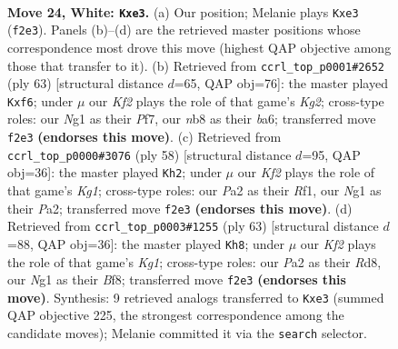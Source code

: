 \documentclass[11pt]{article}
\begin{document}
\clearpage

\begin{figure}[p]\centering
\begin{subfigure}{0.46\textwidth}\centering
\resizebox{\linewidth}{!}{%
\newchessgame
\chessboard[
  setfen={rn5r/8/5p1k/pB1p3p/8/4q3/PP3KP1/1R4N1 w - - 0 24},
  showmover=false,
  pgfstyle=straightmove, color=movearrow, markmove={f2-e3}
]}
\caption{}
\end{subfigure}\hfill
\begin{subfigure}{0.46\textwidth}\centering
\resizebox{\linewidth}{!}{%
\newchessgame
\chessboard[
  setfen={8/3b1pkp/B1nP1Q2/8/p7/8/2rN1PP1/4R1K1 b - - 0 32},
  showmover=false,
  pgfstyle=straightmove, color=movearrow, markmove={g7-f6}
]}
\caption{}
\end{subfigure}
\\[4pt]
\begin{subfigure}{0.46\textwidth}\centering
\resizebox{\linewidth}{!}{%
\newchessgame
\chessboard[
  setfen={3r3k/6p1/p1Q4p/8/7P/4q3/PP4P1/5RK1 w - - 0 30},
  showmover=false,
  pgfstyle=straightmove, color=movearrow, markmove={g1-h2}
]}
\caption{}
\end{subfigure}\hfill
\begin{subfigure}{0.46\textwidth}\centering
\resizebox{\linewidth}{!}{%
\newchessgame
\chessboard[
  setfen={3r1bk1/1p2Np1p/5P2/8/1P6/5P2/1P5P/4R1K1 b - - 2 32},
  showmover=false,
  pgfstyle=straightmove, color=movearrow, markmove={g8-h8}
]}
\caption{}
\end{subfigure}
\caption{\textbf{Move 24, White: \texttt{Kxe3}.} (a) Our position; Melanie plays \texttt{Kxe3} (\texttt{f2e3}). Panels (b)--(d) are the retrieved master positions whose correspondence most drove this move (highest QAP objective among those that transfer to it). (b) Retrieved from \texttt{ccrl\_top\_p0001\#2652} (ply 63) [structural distance $d$=65, QAP obj=76]: the master played \texttt{Kxf6}; under $\mu$ our \emph{Kf2} plays the role of that game's \emph{Kg2}; cross-type roles: our \emph{N}g1 as their \emph{P}f7, our \emph{n}b8 as their \emph{b}a6; transferred move \texttt{f2e3} \textbf{(endorses this move)}. (c) Retrieved from \texttt{ccrl\_top\_p0000\#3076} (ply 58) [structural distance $d$=95, QAP obj=36]: the master played \texttt{Kh2}; under $\mu$ our \emph{Kf2} plays the role of that game's \emph{Kg1}; cross-type roles: our \emph{P}a2 as their \emph{R}f1, our \emph{N}g1 as their \emph{P}a2; transferred move \texttt{f2e3} \textbf{(endorses this move)}. (d) Retrieved from \texttt{ccrl\_top\_p0003\#1255} (ply 63) [structural distance $d$=88, QAP obj=36]: the master played \texttt{Kh8}; under $\mu$ our \emph{Kf2} plays the role of that game's \emph{Kg1}; cross-type roles: our \emph{P}a2 as their \emph{R}d8, our \emph{N}g1 as their \emph{B}f8; transferred move \texttt{f2e3} \textbf{(endorses this move)}. Synthesis: 9 retrieved analogs transferred to \texttt{Kxe3} (summed QAP objective 225, the strongest correspondence among the candidate moves); Melanie committed it via the \texttt{search} selector.}
\label{fig:thought-m46}
\end{figure}
\end{document}
